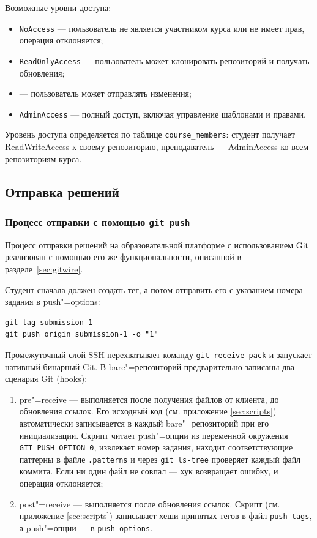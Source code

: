 \documentclass[coursework]{SCWorks}
\begin{document}
Возможные уровни доступа:

\begin{itemize}
	\item \texttt{NoAccess} --- пользователь не является участником курса или не имеет прав, операция отклоняется;
	\item \texttt{ReadOnlyAccess} --- пользователь может клонировать репозиторий и получать обновления;
	\item {} --- пользователь может отправлять изменения;
	\item \texttt{AdminAccess} --- полный доступ, включая управление шаблонами и правами.
\end{itemize}

Уровень доступа определяется по таблице \texttt{course\_members}: студент получает ReadWriteAccess к своему репозиторию, преподаватель --- AdminAccess ко всем репозиториям курса.

\subsection{Отправка решений}

\subsubsection{Процесс отправки с помощью \texttt{git push}}

Процесс отправки решений на образовательной платформе с использованием Git реализован с помощью его же функциональности, описанной в разделе~\ref{sec:gitwire}.

Студент сначала должен создать тег, а потом отправить его с указанием номера задания в push"=options:

\begin{verbatim}
git tag submission-1
git push origin submission-1 -o "1"
\end{verbatim}

Промежуточный слой SSH перехватывает команду \texttt{git-receive-pack} и запускает нативный бинарный Git. В bare"=репозиторий предварительно записаны два сценария Git (hooks):

\begin{enumerate}
	\item pre"=receive --- выполняется после получения файлов от клиента, до обновления ссылок. Его исходный код (см. приложение \ref{sec:scripts}) автоматически записывается в каждый bare"=репозиторий при его инициализации. Скрипт читает push"=опции из переменной окружения \texttt{GIT\_PUSH\_OPTION\_0}, извлекает номер задания, находит соответствующие паттерны в файле \texttt{.patterns} и через \texttt{git ls-tree} проверяет каждый файл коммита. Если ни один файл не совпал --- хук возвращает ошибку, и операция отклоняется;

	\item post"=receive --- выполняется после обновления ссылок. Скрипт (см. приложение \ref{sec:scripts}) записывает хеши принятых тегов в файл \texttt{push-tags}, а push"=опции --- в \texttt{push-options}.
\end{enumerate}
\end{document}
